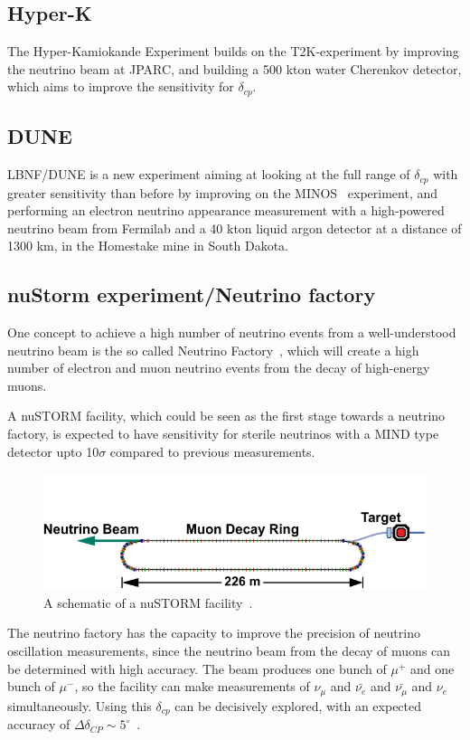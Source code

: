 \subsection{Hyper-K}
The Hyper-Kamiokande Experiment\cite{24HyperK}  builds on the T2K-experiment\cite{21T2K} by improving the neutrino beam at JPARC, and building a 500 kton water Cherenkov detector, which aims to improve the sensitivity for $\delta_{cp}$.
\subsection{DUNE}
LBNF/DUNE\cite{23DUNE} is a new experiment aiming at looking at the full range of $\delta_{cp}$ with greater sensitivity than before by improving on the MINOS~\cite{MINOS} experiment, and performing an electron neutrino appearance measurement with a high-powered neutrino beam from Fermilab and a 40 kton liquid argon detector at a distance of 1300 km, in the Homestake mine in South Dakota.
\subsection{nuStorm experiment/Neutrino factory}
One concept to achieve a high number of neutrino events from a well-understood neutrino beam is the so called Neutrino Factory~\cite{25NUfact}, which will create a high number of electron and muon neutrino events from the decay of high-energy muons.

A nuSTORM facility, which could be seen as the first stage towards a neutrino factory, is expected to have sensitivity for sterile neutrinos with a MIND type detector \cite{29nuSTORM} upto 10$\sigma$ compared to previous measurements.
\begin{figure}[h!]
\centering
\includegraphics[width=\textwidth]{figures/nuSTORM_schematic.pdf}
\caption{A schematic of a nuSTORM facility~\cite{Fix7}.}
\label{fig:nuStorm}
\end{figure}

The neutrino factory has the capacity to improve the precision of neutrino oscillation measurements, since the neutrino beam from the decay of muons can be determined with high accuracy. The beam produces one bunch of $\mu^+$ and one bunch of $\mu^-$, so the facility can make measurements of $\nu_{\mu}$ and $\bar{\nu_{e}}$ and $\bar{\nu_{\mu}}$ and $\nu_{e}$ simultaneously. Using this $\delta_{cp}$ can be decisively explored, with an expected accuracy of $\Delta \delta_{CP}\sim 5^\circ$~\cite{25NUfact}.

